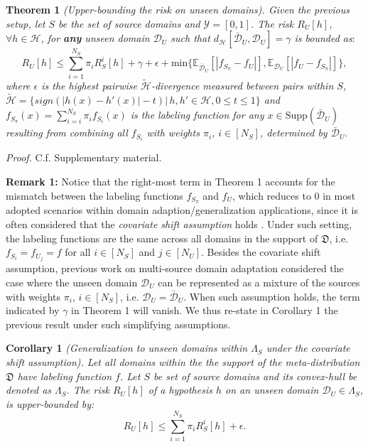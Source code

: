 \documentclass{article}
\begin{document}
\textbf{Theorem 1} \textit{(Upper-bounding the risk on unseen domains). Given the previous setup, let $S$ be the set of source domains and  $\mathcal{Y} = [0, 1]$. The risk $R_U[h]$, $ \forall h \in \mathcal{H}$, for \textbf{any} unseen domain $\mathcal{D}_U$ such that $d_{\mathcal{H}}[\bar{\mathcal{D}}_U, \mathcal{D}_U] = \gamma$ is bounded as}:
\begin{equation}\label{eq:bound_1}
     R_U[h] \leq \sum_{i=1}^{N_S} \pi_{i} R^i_S[h] + \gamma+\epsilon +  \text{min}\{\mathbb{E}_{\bar{\mathcal{D}}_U}[|f_{S_{\pi}} - f_U|], \mathbb{E}_{\mathcal{D}_U}[|f_U - f_{S_\pi}|]\},     
\end{equation}
\textit{where $\epsilon$ is the highest pairwise $\mathcal{\tilde{H}}$-divergence measured between pairs within $S$, $\mathcal{\tilde{H}} = \{sign(|h(x) - h'(x)| - t) | \, h, h' \in \mathcal{H},0\leq t\leq1\}$ and $f_{S_{\pi}}(x) = \sum_{i=i}^{N_S} \pi_i f_{S_i}(x)$ is the labeling function for any $x\in \text{Supp}(\bar{\mathcal{D}}_U)$ resulting from combining all $f_{S_i}$ with weights $\pi_i$, $i\in[N_S]$, determined by $\bar{\mathcal{D}}_U$}.

\textit{Proof.} C.f. Supplementary material.


\textbf{Remark 1:} Notice that the right-most term in Theorem 1 accounts for the mismatch between the labeling functions $f_{S_{\pi}}$ and $f_U$, which reduces to 0 in most adopted scenarios within domain adaption/generalization applications, since it is often considered that the \emph{covariate shift assumption} holds \cite{ben2010impossibility}. Under such setting, the labeling functions are the same across all domains in the support of $\mathfrak{D}$, i.e. $f_{S_i}=f_{U_j}=f$ for all $i\in [N_S]$ and $j\in[N_U]$. Besides the covariate shift assumption, previous work on multi-source domain adaptation \cite{hoffman2018algorithms} considered the case where the unseen domain $\mathcal{D}_U$ can be represented as a mixture of the sources with weights $\pi_i$, $i\in[N_S]$, i.e. $\mathcal{D}_U=\bar{\mathcal{D}}_U$. When such assumption holds, the term indicated by $\gamma$ in Theorem 1 will vanish. We thus re-state in Corollary 1 the previous result under such simplifying assumptions.

\textbf{Corollary 1} \textit{(Generalization to unseen domains within $\Lambda_S$ under the covariate shift assumption). Let all domains within the the support of the meta-distribution $\mathfrak{D}$ have labeling function $f$. Let $S$ be set of source domains and its convex-hull be denoted as $\Lambda_S$. The risk $R_U[h]$ of a hypothesis $h$ on an unseen domain $ \mathcal{D}_U \in \Lambda_S$, is upper-bounded by:}
\begin{equation}\label{eq:cor_1}
     R_U[h] \leq \sum_{i=1}^{N_S} \pi_{i} R^i_S[h] + \epsilon.
\end{equation}
\end{document}
